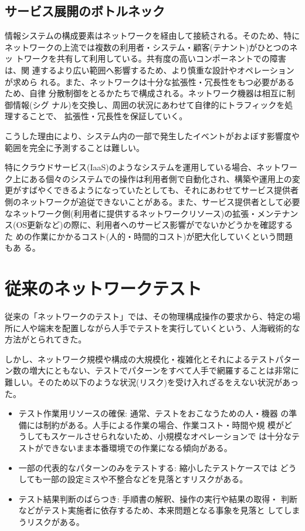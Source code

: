   \subsection{サービス展開のボトルネック}
  \label{sec:bottleneck}

情報システムの構成要素はネットワークを経由して接続される。そのため、特に
ネットワークの上流では複数の利用者・システム・顧客(テナント)がひとつのネッ
トワークを共有して利用している。共有度の高いコンポーネントでの障害は、関
連するより広い範囲へ影響するため、より慎重な設計やオペレーションが求めら
れる。また、ネットワークは十分な拡張性・冗長性をもつ必要があるため、自律
分散制御をとるかたちで構成される。ネットワーク機器は相互に制御情報(シグ
ナル)を交換し、周囲の状況にあわせて自律的にトラフィックを処理することで、
拡張性・冗長性を保証していく。

こうした理由により、システム内の一部で発生したイベントがおよぼす影響度や
範囲を完全に予測することは難しい。

特にクラウドサービス(IaaS)のようなシステムを運用している場合、ネットワー
ク上にある個々のシステムでの操作は利用者側で自動化され、構築や運用上の変
更がすばやくできるようになっていたとしても、それにあわせてサービス提供者
側のネットワークが追従できないことがある。また、サービス提供者として必要
なネットワーク側(利用者に提供するネットワークリソース)の拡張・メンテナン
ス(OS更新など)の際に、利用者へのサービス影響がでないかどうかを確認するた
めの作業にかかるコスト(人的・時間的コスト)が肥大化していくという問題もあ
る。

  \section{従来のネットワークテスト}

  
従来の「ネットワークのテスト」では、その物理構成操作の要求から、特定の場
所に人や端末を配置しながら人手でテストを実行していくという、人海戦術的な
方法がとられてきた。

しかし、ネットワーク規模や構成の大規模化・複雑化とそれによるテストパター
ン数の増大にともない、テストでパターンをすべて人手で網羅することは非常に
難しい。そのため以下のような状況(リスク)を受け入れざるをえない状況があった。
\begin{itemize}
 \item テスト作業用リソースの確保: 通常、テストをおこなうための人・機器
       の準備には制約がある。人手による作業の場合、作業コスト・時間や規
       模がどうしてもスケールさせられないため、小規模なオペレーションで
       は十分なテストができないまま本番環境での作業になる傾向がある。
 \item 一部の代表的なパターンのみをテストする: 縮小したテストケースでは
       どうしても一部の設定ミスや不整合などを見落とすリスクがある。
 \item テスト結果判断のばらつき: 手順書の解釈、操作の実行や結果の取得・
       判断などがテスト実施者に依存するため、本来問題となる事象を見落と
       してしまうリスクがある。
\end{itemize}

